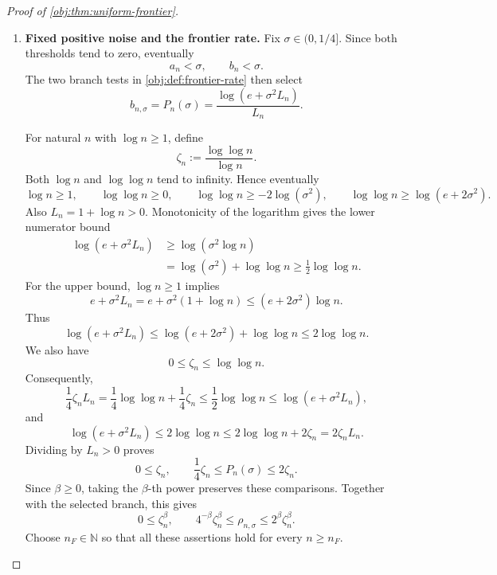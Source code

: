 \documentclass[11pt]{article}
\begin{document}
\begin{proof}[Proof of \cref{obj:thm:uniform-frontier}]
\begin{enumerate}
For \(\sigma\in[b_n/\omega_{\mathrm{win}},\omega_{\mathrm{win}}b_n]\), combine both window comparisons with the second-threshold bounds:
\[
\begin{aligned}
P_n(\sigma)
&\le M_{\mathrm P,\omega_{\mathrm{win}}}P_n(b_n)
\le M_{\mathrm P,\omega_{\mathrm{win}}}C_EF_n(b_n)\\
&\le M_{\mathrm P,\omega_{\mathrm{win}}}C_EM_{\mathrm F,\omega_{\mathrm{win}}}F_n(\sigma)
\le C_KF_n(\sigma),\\
F_n(\sigma)
&\le M_{\mathrm F,\omega_{\mathrm{win}}}F_n(b_n)
\le M_{\mathrm F,\omega_{\mathrm{win}}}C_EP_n(b_n)\\
&\le M_{\mathrm F,\omega_{\mathrm{win}}}C_EM_{\mathrm P,\omega_{\mathrm{win}}}P_n(\sigma)
\le C_KP_n(\sigma).
\end{aligned}
\]
Dividing the first inequality by \(C_K\) establishes
\[
C_K^{-1}P_n(\sigma)\le F_n(\sigma)\le C_KP_n(\sigma).
\]
The choices of \(C_K,n_K\) precede the choice of \(\sigma\), and the same choices apply to both entire windows.

\item \textbf{Fixed positive noise and the frontier rate.}
Fix \(\sigma\in(0,1/4]\). Since both thresholds tend to zero, eventually
\[
a_n<\sigma,\qquad b_n<\sigma.
\]
The two branch tests in \cref{obj:def:frontier-rate} then select
\[
b_{n,\sigma}=P_n(\sigma)
=\frac{\log(e+\sigma^2L_n)}{L_n}.
\]

For natural \(n\) with \(\log n\ge1\), define
\[
\zeta_n:=\frac{\log\log n}{\log n}.
\]
Both \(\log n\) and \(\log\log n\) tend to infinity. Hence eventually
\[
\log n\ge1,\qquad
\log\log n\ge0,\qquad
\log\log n\ge-2\log(\sigma^2),
\qquad
\log\log n\ge\log(e+2\sigma^2).
\]
Also \(L_n=1+\log n>0\). Monotonicity of the logarithm gives the lower numerator bound
\[
\begin{aligned}
\log(e+\sigma^2L_n)
&\ge\log(\sigma^2\log n)\\
&=\log(\sigma^2)+\log\log n
\ge\frac12\log\log n.
\end{aligned}
\]
For the upper bound, \(\log n\ge1\) implies
\[
e+\sigma^2L_n
=e+\sigma^2(1+\log n)
\le(e+2\sigma^2)\log n.
\]
Thus
\[
\log(e+\sigma^2L_n)
\le\log(e+2\sigma^2)+\log\log n
\le2\log\log n.
\]
We also have
\[
0\le\zeta_n\le\log\log n.
\]
Consequently,
\[
\frac14\zeta_nL_n
=\frac14\log\log n+\frac14\zeta_n
\le\frac12\log\log n
\le\log(e+\sigma^2L_n),
\]
and
\[
\log(e+\sigma^2L_n)
\le2\log\log n
\le2\log\log n+2\zeta_n
=2\zeta_nL_n.
\]
Dividing by \(L_n>0\) proves
\[
0\le\zeta_n,\qquad
\frac14\zeta_n\le P_n(\sigma)\le2\zeta_n.
\]
Since \(\beta\ge0\), taking the \(\beta\)-th power preserves these comparisons. Together with the selected branch, this gives
\[
0\le\zeta_n^\beta,\qquad
4^{-\beta}\zeta_n^\beta
\le\rho_{n,\sigma}
\le2^\beta\zeta_n^\beta.
\]
Choose \(n_F\in\mathbb N\) so that all these assertions hold for every \(n\ge n_F\).


\end{enumerate}
\end{proof}
\end{document}
